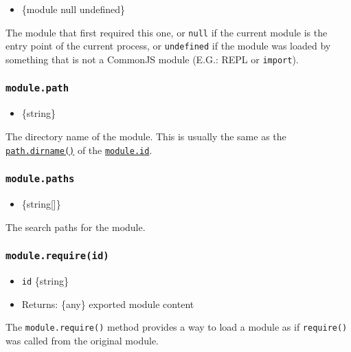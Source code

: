 \begin{itemize}
\tightlist
\item
  \{module \textbar{} null \textbar{} undefined\}
\end{itemize}

The module that first required this one, or \texttt{null} if the current
module is the entry point of the current process, or \texttt{undefined}
if the module was loaded by something that is not a CommonJS module
(E.G.: REPL or \texttt{import}).

\subsubsection{\texorpdfstring{\texttt{module.path}}{module.path}}\label{module.path}

\begin{itemize}
\tightlist
\item
  \{string\}
\end{itemize}

The directory name of the module. This is usually the same as the
\href{path.md\#pathdirnamepath}{\texttt{path.dirname()}} of the
\hyperref[moduleid]{\texttt{module.id}}.

\subsubsection{\texorpdfstring{\texttt{module.paths}}{module.paths}}\label{module.paths}

\begin{itemize}
\tightlist
\item
  \{string{[}{]}\}
\end{itemize}

The search paths for the module.

\subsubsection{\texorpdfstring{\texttt{module.require(id)}}{module.require(id)}}\label{module.requireid}

\begin{itemize}
\tightlist
\item
  \texttt{id} \{string\}
\item
  Returns: \{any\} exported module content
\end{itemize}

The \texttt{module.require()} method provides a way to load a module as
if \texttt{require()} was called from the original module.

